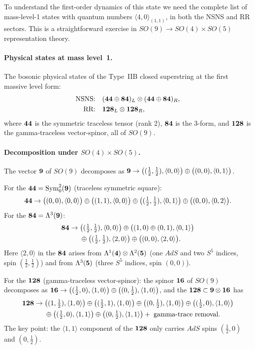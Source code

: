 \documentclass[12pt]{article}
\def\be{\begin{equation}}
\def\ee{\end{equation}}
\def\ie{\begin{equation}\begin{aligned}}
\def\fe{\end{aligned}\end{equation}}
\begin{document}
To understand the first-order dynamics of this state we need the complete list of
mass-level-1 states with quantum numbers $\langle 4,0\rangle_{(1,1)}$, in both the NSNS and
RR sectors. This is a straightforward exercise in $SO(9)\to SO(4)\times SO(5)$
representation theory.

\paragraph{Physical states at mass level~1.}
The bosonic physical states of the Type~IIB closed superstring at the first massive level
form:
\ie
\text{NSNS:}&\quad ({\bf 44}\oplus{\bf 84})_L\otimes({\bf 44}\oplus{\bf 84})_R,\\
\text{RR:}&\quad {\bf 128}_L\otimes{\bf 128}_R,
\fe
where ${\bf 44}$ is the symmetric traceless tensor (rank 2), ${\bf 84}$ is the 3-form, and
${\bf 128}$ is the gamma-traceless vector-spinor, all of $SO(9)$.

\paragraph{Decomposition under $SO(4)\times SO(5)$.}
The vector ${\bf 9}$ of $SO(9)$ decomposes as
${\bf 9}\to\big((\tfrac12,\tfrac12),\langle 0,0\rangle\big)\oplus\big((0,0),\langle 0,1\rangle\big)$.

For the ${\bf 44}=\mathrm{Sym}^2_0({\bf 9})$ (traceless symmetric square):
\be\label{44decomp}
{\bf 44}\to
\big((0,0),\langle 0,0\rangle\big)
\oplus\big((1,1),\langle 0,0\rangle\big)
\oplus\big((\tfrac12,\tfrac12),\langle 0,1\rangle\big)
\oplus\big((0,0),\langle 0,2\rangle\big).
\ee
For the ${\bf 84}=\Lambda^3({\bf 9})$:
\ie\label{84decomp}
{\bf 84}\to{}&
\big((\tfrac12,\tfrac12),\langle 0,0\rangle\big)
\oplus\big((1,0)\oplus(0,1),\langle 0,1\rangle\big)
\nonumber\\
&\oplus\big((\tfrac12,\tfrac12),\langle 2,0\rangle\big)
\oplus\big((0,0),\langle 2,0\rangle\big).
\fe
Here $\langle 2,0\rangle$ in the ${\bf 84}$ arises from $\Lambda^1({\bf 4})\otimes\Lambda^2({\bf 5})$
(one $AdS$ and two $S^5$ indices, spin $(\tfrac12,\tfrac12)$) and from $\Lambda^3({\bf 5})$
(three $S^5$ indices, spin $(0,0)$).

For the ${\bf 128}$ (gamma-traceless vector-spinor): the spinor ${\bf 16}$ of $SO(9)$ decomposes as
${\bf 16}\to\big((\tfrac12,0),\langle 1,0\rangle\big)\oplus\big((0,\tfrac12),\langle 1,0\rangle\big)$,
and the ${\bf 128}\subset{\bf 9}\otimes{\bf 16}$ has
\ie\label{128decomp}
{\bf 128}\to{}&
\big((1,\tfrac12),\langle 1,0\rangle\big)
\oplus\big((\tfrac12,1),\langle 1,0\rangle\big)
\oplus\big((0,\tfrac12),\langle 1,0\rangle\big)
\oplus\big((\tfrac12,0),\langle 1,0\rangle\big)
\nonumber\\
&\oplus\big((\tfrac12,0),\langle 1,1\rangle\big)
\oplus\big((0,\tfrac12),\langle 1,1\rangle\big)
+\;\text{gamma-trace removal.}
\fe
The key point: the $\langle 1,1\rangle$ component of the ${\bf 128}$ only
carries $AdS$ spins $(\tfrac12,0)$ and $(0,\tfrac12)$.
\end{document}
